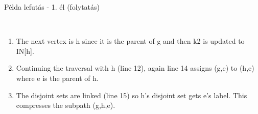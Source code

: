 \begin{frame}{Példa lefutás - 1. él (folytatás)}
\\[0.5em]
\small
\begin{enumerate}
  \item The next vertex is h since it is the parent of g and then k2 is updated to IN[h].
  \item Continuing the traversal with h (line 12), again line 14 assigns (g,e) to (h,e) where e is the parent of h.
  \item The disjoint sets are linked (line 15) so h's disjoint set gets e’s label. This compresses the subpath (g,h,e).
\end{enumerate}
\end{frame}


